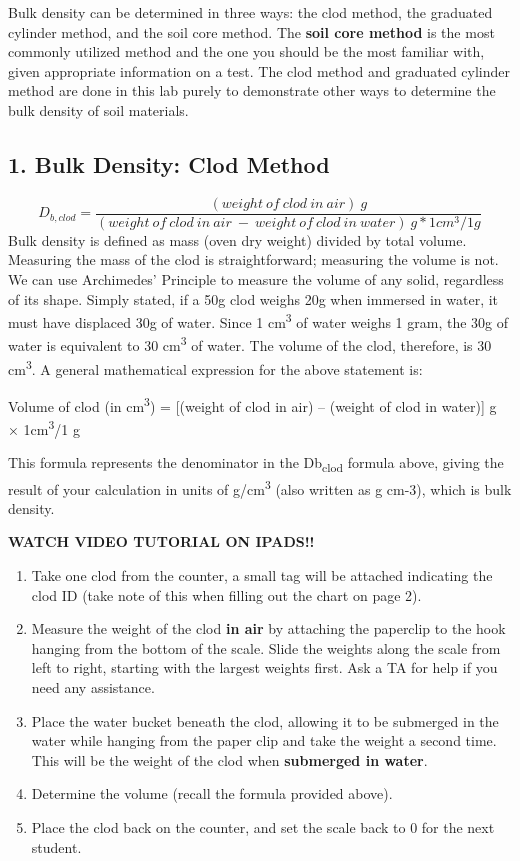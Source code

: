 \documentclass[
  letterpaper,
  twocolumn,
  portrait]{scrbook}
\providecommand{\tightlist}{%
  \setlength{\itemsep}{0pt}\setlength{\parskip}{0pt}}\usepackage{longtable,booktabs,array}
\begin{document}
Bulk density can be determined in three ways: the clod method, the
graduated cylinder method, and the soil core method. The \textbf{soil
core method} is the most commonly utilized method and the one you should
be the most familiar with, given appropriate information on a test. The
clod method and graduated cylinder method are done in this lab purely to
demonstrate other ways to determine the bulk density of soil materials.

\hypertarget{bulk-density-clod-method}{%
\subsection{1. Bulk Density: Clod
Method}\label{bulk-density-clod-method}}

\[
D_{b,clod}=\frac{(weight\ of\ clod\ in\ air)\ g}{(weight\ of\ clod\ in\ air\ -\ weight\ of\ clod\ in\ water)\ g*1cm^{3}/1g}
\] Bulk density is defined as mass (oven dry weight) divided by total
volume. Measuring the mass of the clod is straightforward; measuring the
volume is not. We can use Archimedes' Principle to measure the volume of
any solid, regardless of its shape. Simply stated, if a 50g clod weighs
20g when immersed in water, it must have displaced 30g of water. Since 1
cm\textsuperscript{3} of water weighs 1 gram, the 30g of water is
equivalent to 30 cm\textsuperscript{3} of water. The volume of the clod,
therefore, is 30 cm\textsuperscript{3}. A general mathematical
expression for the above statement is:

Volume of clod (in cm\textsuperscript{3}) = {[}(weight of clod in air)
-- (weight of clod in water){]} g × 1cm\textsuperscript{3}/1 g

This formula represents the denominator in the Db\textsubscript{clod}
formula above, giving the result of your calculation in units of
g/cm\textsuperscript{3} (also written as g cm-3), which is bulk density.

\textbf{WATCH VIDEO TUTORIAL ON IPADS!!}

\begin{enumerate}
\def\labelenumi{\arabic{enumi}.}
\tightlist
\item
  Take one clod from the counter, a small tag will be attached
  indicating the clod ID (take note of this when filling out the chart
  on page 2).
\item
  Measure the weight of the clod \textbf{in air} by attaching the
  paperclip to the hook hanging from the bottom of the scale. Slide the
  weights along the scale from left to right, starting with the largest
  weights first. Ask a TA for help if you need any assistance.
\item
  Place the water bucket beneath the clod, allowing it to be submerged
  in the water while hanging from the paper clip and take the weight a
  second time. This will be the weight of the clod when
  \textbf{submerged in water}.
\item
  Determine the volume (recall the formula provided above).
\item
  Place the clod back on the counter, and set the scale back to 0 for
  the next student.
\end{enumerate}
\end{document}
